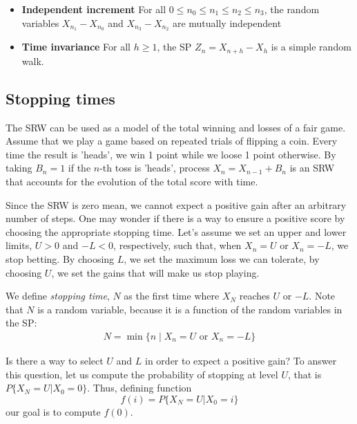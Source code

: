 \begin{itemize}
\item \textbf{Independent increment} For all $0 \le n_0 \le n_1 \le n_2 \le n_3$, the random variables $X_{n_1} - X_{n_0}$ and $X_{n_3} - X_{n_2}$ are mutually independent
\item \textbf{Time invariance} For all $h \ge 1$, the SP $Z_n = X_{n+h} - X_h$ is a simple random walk.
\end{itemize}

\subsection{Stopping times}

The SRW can be used as a model of the total winning and losses of a fair game. Assume that we play a game based on repeated trials of flipping a coin. Every time the result is 'heads', we win 1 point while we loose 1 point otherwise. By taking $B_n=1$ if the $n$-th toss is 'heads', process $X_n=X_{n-1}+B_n$ is an SRW that accounts for the evolution of the total score with time.

Since the SRW is zero mean, we cannot expect a positive gain after an arbitrary number of steps. One may wonder if there is a way to ensure a positive score by choosing the appropriate stopping time. Let's assume we set an upper and lower limits, $U>0$ and $-L<0$, respectively, such that, when $X_n=U$ or $X_n=-L$, we stop betting. By choosing $L$, we set the maximum loss we can tolerate, by choosing $U$, we set the gains that will make us stop playing.

We define {\em stopping time}, $N$ as the first time where $X_N$ reaches $U$ or $-L$. Note that $N$ is a random variable, because it is a function of the random variables in the SP:
\begin{align}
N = \min\{n \mid X_n = U \text{ or } X_n = -L \} 
\end{align}

Is there a way to select $U$ and $L$ in order to expect a positive gain? To answer this question, let us compute the probability of stopping at level $U$, that is $P\{X_N=U|X_0=0\}$. Thus, defining function
$$
f(i) = P\{X_N = U | X_0 = i\}
$$
our goal is to compute $f(0)$. 

